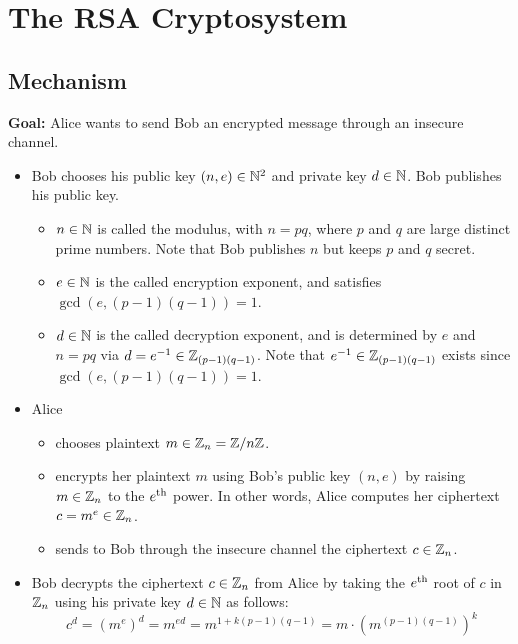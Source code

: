 
\section{The RSA Cryptosystem}
\setcounter{theorem}{0}
\setcounter{equation}{0}

\subsection{Mechanism}

\textbf{Goal:} Alice wants to send Bob an encrypted message through an insecure channel.
\begin{itemize}
\item	Bob chooses his public key $(n,e) \in \mathbb{N}^{2}$ and private key $d \in \mathbb{N}$.
	Bob publishes his public key.
	\begin{itemize}
	\item	$n \in \mathbb{N}$ is called the modulus, with $n = pq$, where $p$ and $q$ are large distinct
		prime numbers.  Note that Bob publishes $n$ but keeps $p$ and $q$ secret.
	\item	$e \in \mathbb{N}$ is the called encryption exponent, and satisfies $\gcd(e,(p-1)(q-1)) = 1$.
	\item	$d \in \mathbb{N}$ is the called decryption exponent, and is determined by $e$ and $n = pq$
		via $d = e^{-1} \in \mathbb{Z}_{(p-1)(q-1)}$.
		Note that $e^{-1} \in \mathbb{Z}_{(p-1)(q-1)}$ exists since $\gcd(e,(p-1)(q-1)) = 1$.
	\end{itemize}
\item	Alice
	\begin{itemize}
	\item	chooses plaintext $m \in \mathbb{Z}_{n} = \mathbb{Z}/n\mathbb{Z}$.
	\item	encrypts her plaintext $m$ using Bob's public key $(n,e)$
		by {\color{red}raising $m \in \mathbb{Z}_{n}$ to the $e^{\textnormal{th}}$ power}.
		In other words, Alice computes her ciphertext $c = m^{e} \in \mathbb{Z}_{n}$.
	\item	sends to Bob through the insecure channel the ciphertext $c \in \mathbb{Z}_{n}$.
	\end{itemize}
\item	Bob decrypts the ciphertext $c \in \mathbb{Z}_{n}$ from Alice by
	{\color{red}taking the $e^{\textnormal{th}}$ root}
	of $c$ in $\mathbb{Z}_{n}$ using his private key $d \in \mathbb{N}$ as follows:
	\begin{equation*}
	c^{d} = \left(m^{e}\right)^{d} = m^{ed} = m^{1+k(p-1)(q-1)} = m \cdot (m^{(p-1)(q-1)})^{k}

\end{equation*}
\end{itemize}
